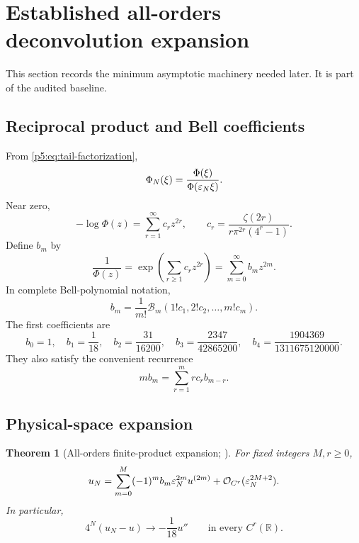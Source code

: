 \documentclass[11pt,oneside]{article}
\numberwithin{equation}{section}
\newtheorem{theorem}{Theorem}[section]
\theoremstyle{definition}
\theoremstyle{remark}
\newcommand{\R}{\mathbb R}
\newcommand{\bigO}{\mathcal O}
\begin{document}
\section{Established all-orders deconvolution expansion}
\label{p5:sec:allorders}

This section records the minimum asymptotic machinery needed later.  It is part of the audited baseline.

\subsection{Reciprocal product and Bell coefficients}

From \eqref{p5:eq:tail-factorization},
\begin{equation}
 \Phi_N(\xi)=\frac{\Phi(\xi)}{\Phi(\varepsilon_N\xi)}.
 \label{p5:eq:deconvolution-quotient}
\end{equation}
Near zero,
\begin{equation}
 -\log\Phi(z)=\sum_{r=1}^{\infty}c_rz^{2r},
 \qquad
 c_r=\frac{\zeta(2r)}{r\pi^{2r}(4^r-1)}.
 \label{p5:eq:logphi}
\end{equation}
Define $b_m$ by
\begin{equation}
 \frac1{\Phi(z)}=\exp\!\left(\sum_{r\ge1}c_rz^{2r}\right)
 =\sum_{m=0}^{\infty}b_mz^{2m}.
 \label{p5:eq:bmdef}
\end{equation}
In complete Bell-polynomial notation,
\begin{equation}
 b_m=\frac1{m!}\mathcal B_m(1!c_1,2!c_2,\ldots,m!c_m).
 \label{p5:eq:bell-bm}
\end{equation}
The first coefficients are
\begin{equation}
 b_0=1,
 \quad b_1=\frac1{18},
 \quad b_2=\frac{31}{16200},
 \quad b_3=\frac{2347}{42865200},
 \quad b_4=\frac{1904369}{1311675120000}.
 \label{p5:eq:first-b}
\end{equation}
They also satisfy the convenient recurrence
\begin{equation}
 mb_m=\sum_{r=1}^{m}r c_r b_{m-r}.
 \label{p5:eq:b-rec}
\end{equation}

\subsection{Physical-space expansion}

\begin{theorem}[All-orders finite-product expansion; \baseline]
For fixed integers $M,r\ge0$,
\begin{equation}
 u_N
 =\sum_{m=0}^{M}(-1)^m b_m\eps_N^{2m}u^{(2m)}
 +\bigO_{C^r}(\eps_N^{2M+2}).
 \label{p5:eq:physical-expansion}
\end{equation}
In particular,
\begin{equation}
 4^N(u_N-u)\longrightarrow-\frac1{18}u''
 \qquad\text{in every }C^r(\R).
 \label{p5:eq:leading-density}
\end{equation}
\end{theorem}
\end{document}

